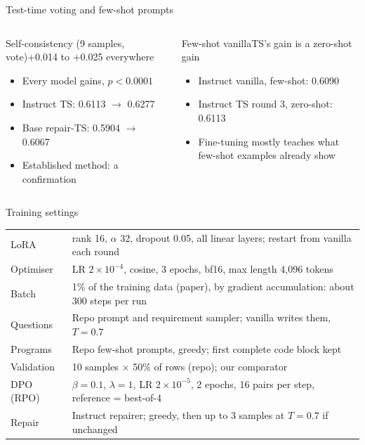 \documentclass[11pt,aspectratio=169]{beamer}
\begin{document}
\begin{frame}{Test-time voting and few-shot prompts}
\vspace{0.1cm}
\begin{columns}[T]
\begin{tscard}[tsnavy]{Self-consistency (9 samples, vote)}{+0.014 to +0.025 everywhere}
\begin{itemize}\setlength{\itemsep}{0pt}
\item Every model gains, $p<0.0001$
\item Instruct TS: 0.6113 $\to$ 0.6277
\item Base repair-TS: 0.5904 $\to$ 0.6067
\item Established method: a confirmation
\end{itemize}
\end{tscard}
\begin{tscard}[tsred]{Few-shot vanilla}{TS's gain is a zero-shot gain}
\begin{itemize}\setlength{\itemsep}{0pt}
\item Instruct vanilla, few-shot: 0.6090
\item Instruct TS round 3, zero-shot: 0.6113
\item Fine-tuning mostly teaches what few-shot examples already show
\end{itemize}
\end{tscard}
\end{columns}
\vspace{0.15cm}
\end{frame}

\begin{frame}{Training settings}
\vspace{0.05cm}
{\footnotesize\setlength{\tabcolsep}{5pt}
\begin{tabular}{@{}L{3.4cm}L{9.6cm}@{}}
\toprule
{} & \\\midrule
LoRA & rank 16, $\alpha$ 32, dropout 0.05, all linear layers; restart from vanilla each round\\
Optimiser & LR $2\times10^{-4}$, cosine, 3 epochs, bf16, max length 4,096 tokens\\
Batch & 1\% of the training data (paper), by gradient accumulation: about 300 steps per run\\
Questions & Repo prompt and requirement sampler; vanilla writes them, $T=0.7$\\
Programs & Repo few-shot prompts, greedy; first complete code block kept\\
Validation & 10 samples $\times$ 50\% of rows (repo); our comparator\\
DPO (RPO) & $\beta=0.1$, $\lambda=1$, LR $2\times10^{-5}$, 2 epochs, 16 pairs per step, reference = best-of-4\\
Repair & Instruct repairer; greedy, then up to 3 samples at $T=0.7$ if unchanged\\
\bottomrule
\end{tabular}}
\end{frame}
\end{document}
